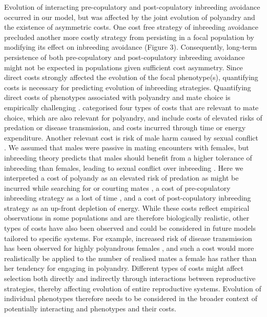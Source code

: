 \documentclass[12pt]{article}
\begin{document}
Evolution of interacting pre-copulatory and post-copulatory inbreeding avoidance occurred in our model, but was affected by the joint evolution of polyandry and the existence of asymmetric costs. One cost free strategy of inbreeding avoidance precluded another more costly strategy from persisting in a focal population by modifying its effect on inbreeding avoidance (Figure 3). Consequently, long-term persistence of both pre-copulatory and post-copulatory inbreeding avoidance might not be expected in populations given sufficient cost asymmetry. Since direct costs strongly affected the evolution of the focal phenotype(s), quantifying costs is necessary for predicting evolution of inbreeding strategies. Quantifying direct costs of phenotypes associated with polyandry and mate choice is empirically challenging \cite[][]{Pomiankowski1987, Kokko2003}. \cite{Pomiankowski1987} categorised four types of costs that are relevant to mate choice, which are also relevant for polyandry, and include costs of elevated risks of predation or disease transmission, and costs incurred through time or energy expenditure. Another relevant cost is risk of male harm caused by sexual conflict \cite[e.g.,][]{Arnqvist2005a, Parker2006}. We assumed that males were passive in mating encounters with females, but inbreeding theory predicts that males should benefit from a higher tolerance of inbreeding than females, leading to sexual conflict over inbreeding \cite[][]{Parker1979, Parker2006, Kokko2006, Duthie2015a}. Here we interpreted a cost of polyandy as an elevated risk of predation as might be incurred while searching for or courting mates \cite[e.g.,][]{Rowe1988, Rowe1994}, a cost of pre-copulatory inbreeding strategy as a lost of time \cite[i.e., risk of not finding a mate in time due to choosiness; e.g.,][]{Kokko2013}, and a cost of post-copulatory inbreeding strategy as an up-front depletion of energy. While these costs reflect empirical observations in some populations and are therefore biologically realistic, other types of costs have also been observed and could be considered in future models tailored to specific systems. For example, increased risk of disease transmission has been observed for highly polyandrous females \cite[][]{Roberts2015a}, and such a cost would more realistically be applied to the number of realised mates a female has rather than her tendency for engaging in polyandry. Different types of costs might affect selection both directly and indirectly through interactions between reproductive strategies, thereby affecting evolution of entire reproductive systems. Evolution of individual phenotypes therefore needs to be considered in the broader context of potentially interacting and phenotypes and their costs.
\end{document}
